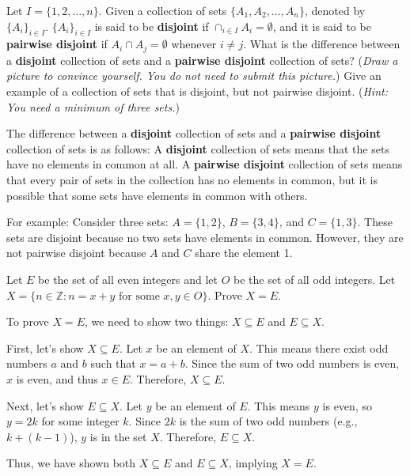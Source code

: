 \documentclass{article}
\newcommand{\Z}{\mathbb{Z}}
\theoremstyle{definition}
\begin{document}
\begin{question}
   Let $I=\{1, 2, \dots, n\}$. Given a collection of sets $\{A_1,A_2,\dots, A_n\}$, denoted by $\{A_i\}_{i\in I}$. $\{A_i\}_{i\in I}$ is said to be \textbf{disjoint} if $\cap_{i\in I}A_i=\emptyset$, and it is said to be \textbf{pairwise disjoint} if $A_i\cap A_j=\emptyset$ whenever $i\neq j$. What is the difference between a \textbf{disjoint} collection of sets and a \textbf{pairwise disjoint} collection of sets? (\textit{Draw a picture to convince yourself. You do not need to submit this picture.}) Give an example of a collection of sets that is disjoint, but not pairwise disjoint. (\textit{Hint: You need a minimum of three sets.})
\end{question}
\begin{solution}
The difference between a \textbf{disjoint} collection of sets and a \textbf{pairwise disjoint} collection of sets is as follows:
A \textbf{disjoint} collection of sets means that the sets have no elements in common at all.
A \textbf{pairwise disjoint} collection of sets means that every pair of sets in the collection has no elements in common, but it is possible that some sets have elements in common with others.

For example:
Consider three sets: $A = \{1, 2\}$, $B = \{3, 4\}$, and $C = \{1, 3\}$. These sets are disjoint because no two sets have elements in common. However, they are not pairwise disjoint because $A$ and $C$ share the element 1.
\end{solution}



\begin{question}
   Let $E$ be the set of all even integers and let $O$ be the set of all odd integers. Let $X=\{ n\in \Z : n = x+y \text{ for some } x, y\in O\}$. Prove $X=E$.
\end{question}
\begin{solution}
To prove $X = E$, we need to show two things: $X \subseteq E$ and $E \subseteq X$.

First, let's show $X \subseteq E$. Let $x$ be an element of $X$. This means there exist odd numbers $a$ and $b$ such that $x = a + b$. Since the sum of two odd numbers is even, $x$ is even, and thus $x \in E$. Therefore, $X \subseteq E$.

Next, let's show $E \subseteq X$. Let $y$ be an element of $E$. This means $y$ is even, so $y = 2k$ for some integer $k$. Since $2k$ is the sum of two odd numbers (e.g., $k + (k-1)$), $y$ is in the set $X$. Therefore, $E \subseteq X$.

Thus, we have shown both $X \subseteq E$ and $E \subseteq X$, implying $X = E$.
\end{solution}
\end{document}
